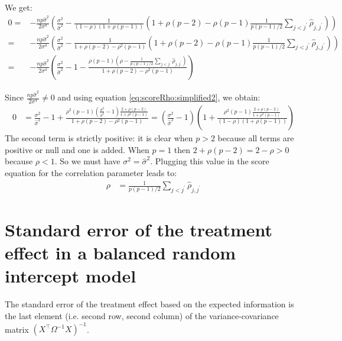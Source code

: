 \documentclass[12pt]{article}
\newcommand\trans[1]{{#1}^\intercal}%
\begin{document}
We get:
\begin{align*}
0 =&-\frac{np \widehat{\sigma}^2}{2 \sigma^4}\left(\frac{\sigma^2}{\widehat{\sigma}^2} -\frac{1}{(1- \rho)(1+\rho(p-1))}\left(1 + \rho (p-2) - \rho(p-1)\frac{1}{p(p-1)/2}\sum_{j < j^{\prime}}\widehat{\rho}_{j,j^{\prime}}\right)\right)   \\
  =&-\frac{np \widehat{\sigma}^2}{2 \sigma^4}\left(\frac{\sigma^2}{\widehat{\sigma}^2} -\frac{1}{1 + \rho(p-2)  - \rho^2(p-1)}\left(1 + \rho (p-2) - \rho(p-1)\frac{1}{p(p-1)/2}\sum_{j < j^{\prime}}\widehat{\rho}_{j,j^{\prime}}\right)\right) \\
  =&-\frac{np \widehat{\sigma}^2}{2 \sigma^4}\left(\frac{\sigma^2}{\widehat{\sigma}^2} - 1  - \frac{\rho(p-1)\left(\rho-\frac{1}{p(p-1)/2}\sum_{j < j^{\prime}}\widehat{\rho}_{j,j^{\prime}}\right)}{1 + \rho(p-2)  - \rho^2(p-1)}\right) 
\end{align*}

Since \(\frac{np \widehat{\sigma}^2}{2 \sigma^4}\neq 0\) and using equation \autoref{eq:scoreRho:simplified2}, we obtain:
\begin{align*}
0 &= \frac{\sigma^2}{\widehat{\sigma}^2} - 1 + \frac{\rho^2(p-1)\left(\frac{\sigma^2}{\widehat{\sigma}^2}-1\right)\frac{2+\rho (p-2)}{1 + \rho^2(p-1)}}{1 + \rho(p-2)  - \rho^2(p-1)} 
= \left(\frac{\sigma^2}{\widehat{\sigma}^2} - 1\right) \left(1 + \frac{\rho^2(p-1)\frac{2+\rho (p-2)}{1 + \rho^2(p-1)}}{(1- \rho)(1+\rho(p-1))}\right) 
\end{align*}
The second term is strictly positive: it is clear when \(p>2\) because
all terms are positive or null and one is added. When \(p=1\) then \(2+\rho
(p-2)=2-\rho>0\) because \(\rho<1\). So we must have \(\sigma^2 =
\widehat{\sigma}^2\). Plugging this value in the score equation for
the correlation parameter leads to:
\begin{align*}
\rho &= \frac{1}{p(p-1)/2}\sum_{j < j^{\prime}}\widehat{\rho}_{j,j^{\prime}} 
\end{align*}

\section{Standard error of the treatment effect \newline in a balanced random intercept model}
\label{sm:seRI}
The standard error of the treatment effect based on the expected
information is the last element (i.e. second row, second column) of
the variance-covariance matrix \(\left(\trans{X} \Omega^{-1}
X\right)^{-1}\).
\end{document}
